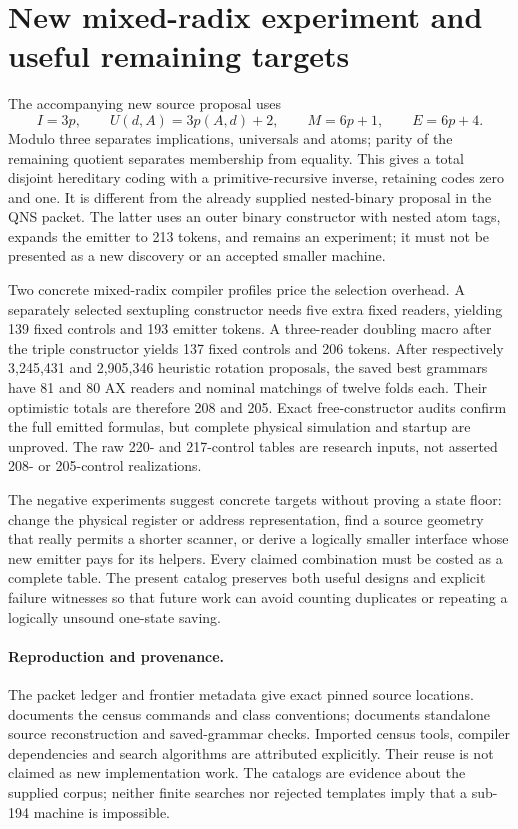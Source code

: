 \documentclass[10pt]{article}
\newcommand{\packet}[1]{\texttt{\detokenize{#1}}}
\begin{document}
\section{New mixed-radix experiment and useful remaining targets}

The accompanying new source proposal uses
\[
 I=3p,\qquad U(d,A)=3p(A,d)+2,\qquad
 M=6p+1,\qquad E=6p+4.
\]
Modulo three separates implications, universals and atoms; parity of the
remaining quotient separates membership from equality. This gives a total
disjoint hereditary coding with a primitive-recursive inverse, retaining
codes zero and one. It is different from the already supplied nested-binary
proposal in the QNS packet. The latter uses an outer binary constructor with
nested atom tags, expands the emitter to 213 tokens, and remains an experiment;
it must not be presented as a new discovery or an accepted smaller machine.

Two concrete mixed-radix compiler profiles price the selection overhead.
A separately selected sextupling constructor needs five extra fixed readers,
yielding 139 fixed controls and 193 emitter tokens. A three-reader doubling
macro after the triple constructor yields 137 fixed controls and 206 tokens.
After respectively 3,245,431 and 2,905,346 heuristic rotation proposals, the
saved best grammars have 81 and 80 AX readers and nominal matchings of twelve
folds each. Their optimistic totals are therefore 208 and 205. Exact
free-constructor audits confirm the full emitted formulas, but complete
physical simulation and startup are unproved. The raw 220- and 217-control
tables are research inputs, not asserted 208- or 205-control realizations.

The negative experiments suggest concrete targets without proving a state
floor: change the physical register or address representation, find a source
geometry that really permits a shorter scanner, or derive a logically smaller
interface whose new emitter pays for its helpers. Every claimed combination
must be costed as a complete table. The present catalog preserves both useful
designs and explicit failure witnesses so that future work can avoid counting
duplicates or repeating a logically unsound one-state saving.

\paragraph{Reproduction and provenance.}
The packet ledger and frontier metadata give exact pinned source locations.
\packet{REPRODUCE.txt} documents the census commands and class conventions;
\packet{mixed36/README.txt} documents standalone source reconstruction and
saved-grammar checks. Imported census tools, compiler dependencies and search
algorithms are attributed explicitly. Their reuse is not claimed as new
implementation work. The catalogs are evidence about the supplied corpus;
neither finite searches nor rejected templates imply that a sub-194 machine
is impossible.
\end{document}
